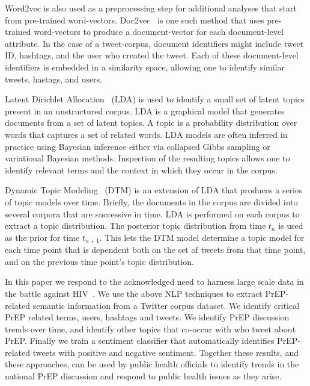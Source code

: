 \documentclass{sig-alternate-05-2015}
\begin{document}
Word2vec is also used as a preprocessing step for additional analyses that start from pre-trained word-vectors. Doc2vec~\cite{le2014distributed} is one such method that uses pre-trained word-vectors to produce a document-vector for each document-level attribute. In the case of a tweet-corpus, document identifiers might include tweet ID, hashtags, and the user who created the tweet. Each of these document-level identifiers is embedded in a similarity space, allowing one to identify similar tweets, hastags, and users.

Latent Dirichlet Allocation~\cite{blei2003latent} (LDA) is used to identify a small set of latent topics present in an unstructured corpus. LDA is a graphical model that generates documents from a set of latent topics. A topic is a probability distribution over words that captures a set of related words. LDA models are often inferred in practice using Bayesian inference either via collapsed Gibbs sampling or variational Bayesian methods. Inspection of the resulting topics allows one to identify relevant terms and the context in which they occur in the corpus. 

Dynamic Topic Modeling~\cite{blei2006dynamic} (DTM) is an extension of LDA that produces a series of topic models over time. Briefly, the documents in the corpus are divided into several corpora that are successive in time. LDA is performed on each corpus to extract a topic distribution. The posterior topic distribution from time $t_n$ is used as the prior for time $t_{n+1}$. This lets the DTM model determine a topic model for each time point that is dependent both on the set of tweets from that time point, and on the previous time point's topic distribution.

In this paper we respond to the acknowledged need to harness large scale data in the battle against HIV~\cite{young2015big}. We use the above NLP techniques to extract PrEP-related semantic information from a Twitter corpus dataset. We identify critical PrEP related terms, users, hashtags and tweets. We identify PrEP discussion trends over time, and identify other topics that co-occur with who tweet about PrEP. Finally we train a sentiment classifier that automatically identifies PrEP-related tweets with positive and negative sentiment. Together these results, and these approaches, can be used by public health officials to identify trends in the national PrEP discussion and respond to public health issues as they arise.
\end{document}
